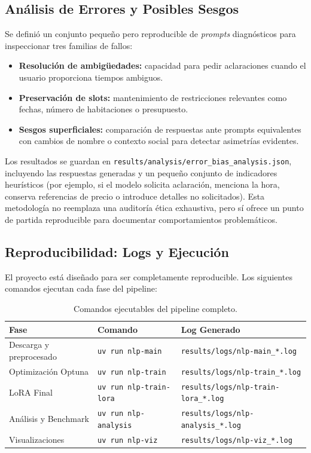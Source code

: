 \subsection{Análisis de Errores y Posibles Sesgos}

Se definió un conjunto pequeño pero reproducible de \textit{prompts} diagnósticos para inspeccionar tres familias de fallos:
\begin{itemize}
    \item \textbf{Resolución de ambigüedades:} capacidad para pedir aclaraciones cuando el usuario proporciona tiempos ambiguos.
    \item \textbf{Preservación de slots:} mantenimiento de restricciones relevantes como fechas, número de habitaciones o presupuesto.
    \item \textbf{Sesgos superficiales:} comparación de respuestas ante prompts equivalentes con cambios de nombre o contexto social para detectar asimetrías evidentes.
\end{itemize}

Los resultados se guardan en \texttt{results/analysis/error\_bias\_analysis.json}, incluyendo las respuestas generadas y un pequeño conjunto de indicadores heurísticos (por ejemplo, si el modelo solicita aclaración, menciona la hora, conserva referencias de precio o introduce detalles no solicitados). Esta metodología no reemplaza una auditoría ética exhaustiva, pero sí ofrece un punto de partida reproducible para documentar comportamientos problemáticos.

\subsection{Reproducibilidad: Logs y Ejecución}

El proyecto está diseñado para ser completamente reproducible. Los siguientes comandos ejecutan cada fase del pipeline:

\begin{table}[H]
    \centering
    \small
    \begin{tabularx}{\textwidth}{|l|X|X|}
        \hline
        \textbf{Fase} & \textbf{Comando} & \textbf{Log Generado} \\ \hline
        Descarga y preprocesado & \texttt{uv run nlp-main} & \texttt{results/logs/nlp-main\_*.log} \\ \hline
        Optimización Optuna & \texttt{uv run nlp-train} & \texttt{results/logs/nlp-train\_*.log} \\ \hline
        LoRA Final & \texttt{uv run nlp-train-lora} & \texttt{results/logs/nlp-train-lora\_*.log} \\ \hline
        Análisis y Benchmark & \texttt{uv run nlp-analysis} & \texttt{results/logs/nlp-analysis\_*.log} \\ \hline
        Visualizaciones & \texttt{uv run nlp-viz} & \texttt{results/logs/nlp-viz\_*.log} \\ \hline
    \end{tabularx}
    \caption{Comandos ejecutables del pipeline completo.}
    \label{tab:comandos_ejecutables}
\end{table}


